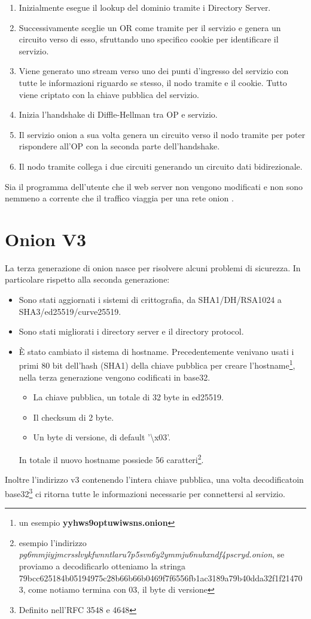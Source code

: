 \begin{enumerate}
    \item Inizialmente esegue il lookup del dominio tramite i Directory Server.
    \item Successivamente sceglie un OR come tramite per il servizio e genera un circuito verso di esso, sfruttando uno specifico cookie per identificare il servizio.
    \item Viene generato uno stream verso uno dei punti d'ingresso del servizio con tutte le informazioni riguardo se stesso, il nodo tramite e il cookie. Tutto viene criptato con la chiave pubblica del servizio.
    \item Inizia l'handshake di Diffle-Hellman tra OP e servizio.
    \item Il servizio onion a sua volta genera un circuito verso il nodo tramite per poter rispondere all'OP con la seconda parte dell'handshake.
    \item Il nodo tramite collega i due circuiti generando un circuito dati bidirezionale.
\end{enumerate}
Sia il programma dell'utente che il web server non vengono modificati e non sono nemmeno a corrente che il traffico viaggia per una rete onion \cite{ChaumMixes}.
\section{Onion V3}
La terza generazione di onion nasce per risolvere alcuni problemi di sicurezza. In particolare rispetto alla seconda generazione:
\begin{itemize}
    \item Sono stati aggiornati i sistemi di crittografia, da SHA1/DH/RSA1024 a SHA3/ed25519/curve25519.
    \item Sono stati migliorati i directory server e il directory protocol.
    \item È stato cambiato il sistema di hostname. Precedentemente venivano usati i primi 80 bit dell'hash (SHA1) della chiave pubblica per creare l'hostname\footnote{un esempio \textbf{yyhws9optuwiwsns.onion}}, nella terza generazione vengono codificati in base32.
    \begin{itemize}
        \item La chiave pubblica, un totale di 32 byte in ed25519.
        \item Il checksum di 2 byte.
        \item Un byte di versione, di default '\textbackslash x03'.
    \end{itemize}
    In totale il nuovo hostname possiede 56 caratteri\footnote{esempio l'indirizzo \emph{pg6mmjiyjmcrsslvykfwnntlaru7p5svn6y2ymmju6nubxndf4pscryd.onion}, se proviamo a decodificarlo otteniamo la stringa 79bcc625184b05194975c28b66b66b0469f7f6556fb1ac3189a79b40dda32f1f214703, come notiamo termina con 03, il byte di versione}.
\end{itemize}
Inoltre l'indirizzo v3 contenendo l'intera chiave pubblica, una volta decodificato\footnotemark[2] in base32\footnote{Definito nell'RFC 3548 e 4648} ci ritorna tutte le informazioni necessarie per connettersi al servizio. \\
\cite{Torv3}

